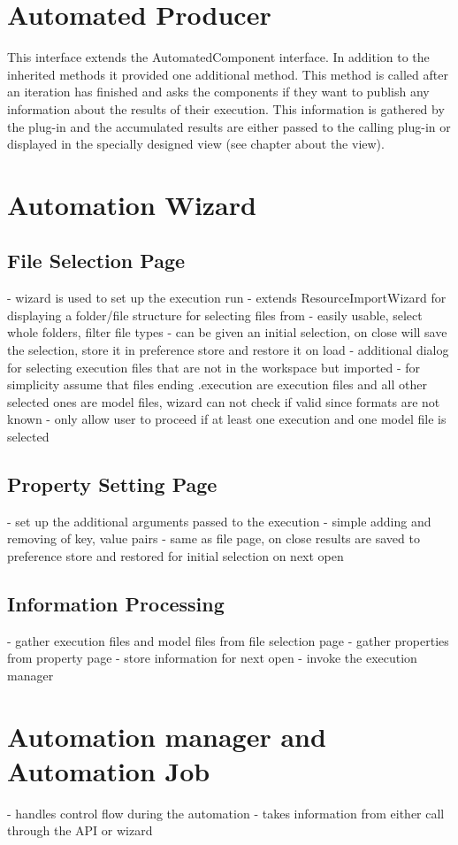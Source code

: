 \section{Automated Producer}
This interface extends the AutomatedComponent interface.
In addition to the inherited methods it provided one additional method.
This method is called after an iteration has finished and asks the components
if they want to publish any information about the results of their execution.
This information is gathered by the plug-in and the accumulated results
are either passed to the calling plug-in or displayed in the
specially designed view (see chapter about the view).

\section{Automation Wizard}
\subsection{File Selection Page}
- wizard is used to set up the execution run
- extends ResourceImportWizard for displaying a folder/file structure for selecting files from
- easily usable, select whole folders, filter file types
- can be given an initial selection, on close will save the selection, store it in preference store
and restore it on load
- additional dialog for selecting execution files that are not in the workspace but imported
- for simplicity assume that files ending .execution are execution files and all other selected
ones are model files, wizard can not check if valid since formats are not known
- only allow user to proceed if at least one execution and one model file is selected
\subsection{Property Setting Page}
- set up the additional arguments passed to the execution
- simple adding and removing of key, value pairs
- same as file page, on close results are saved to preference store and restored for initial
selection on next open
\subsection{Information Processing}
- gather execution files and model files from file selection page
- gather properties from property page
- store information for next open
- invoke the execution manager

\section{Automation manager and Automation Job}
- handles control flow during the automation
- takes information from either call through the API or wizard

